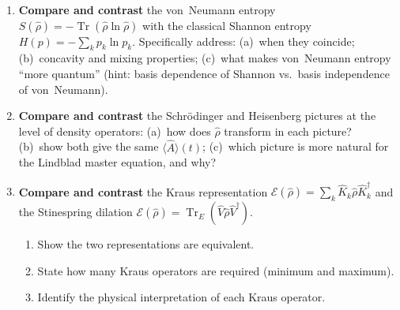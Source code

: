 \documentclass[11pt,a4paper]{article}
\begin{document}
\begin{tcolorbox}[gradconceptbox, title={Part II --- Compare and Contrast \hfill\normalfont 3 $\times$ 3 pts = 9 pts}]

\begin{enumerate}[leftmargin=1.8em, label=\textbf{Q\arabic*.}, itemsep=14pt, start=5]

\item {}
  \textbf{Compare and contrast} the von~Neumann entropy $S(\hat{\rho})=-\operatorname{Tr}(\hat{\rho}\ln\hat{\rho})$
  with the classical Shannon entropy $H(p)=-\sum_k p_k\ln p_k$.
  Specifically address:
  (a)~when they coincide;
  (b)~concavity and mixing properties;
  (c)~what makes von~Neumann entropy ``more quantum'' (hint: basis dependence of Shannon
  vs.\ basis independence of von~Neumann).

  \vspace{3.5cm}

\item {}
  \textbf{Compare and contrast} the Schr\"odinger and Heisenberg pictures
  at the level of density operators:
  (a)~how does $\hat{\rho}$ transform in each picture?
  (b)~show both give the same $\langle\hat{A}\rangle(t)$;
  (c)~which picture is more natural for the Lindblad master equation, and why?

  \vspace{3.5cm}

\item {}
  \textbf{Compare and contrast} the Kraus representation
  $\mathcal{E}(\hat{\rho})=\sum_k\hat{K}_k\hat{\rho}\hat{K}_k^\dagger$
  and the Stinespring dilation
  $\mathcal{E}(\hat{\rho})=\operatorname{Tr}_E(\hat{V}\hat{\rho}\hat{V}^\dagger)$.
  \begin{enumerate}[label=(\alph*), itemsep=4pt]
    \item Show the two representations are equivalent.
    \item State how many Kraus operators are required (minimum and maximum).
    \item Identify the physical interpretation of each Kraus operator.
  \end{enumerate}

  \vspace{3.5cm}

\end{enumerate}
\end{tcolorbox}
\end{document}
